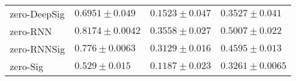 \begin{tabular}{llll}
zero-DeepSig   &                            $ 0.6951 \pm 0.049 $ &                            $ 0.1523 \pm 0.047 $ &                           $ 0.3527 \pm 0.041 $ \\
zero-RNN       &                           $ 0.8174 \pm 0.0042 $ &                            $ 0.3558 \pm 0.027 $ &                           $ 0.5007 \pm 0.022 $ \\
zero-RNNSig    &                            $ 0.776 \pm 0.0063 $ &                            $ 0.3129 \pm 0.016 $ &                           $ 0.4595 \pm 0.013 $ \\
zero-Sig       &                             $ 0.529 \pm 0.015 $ &                            $ 0.1187 \pm 0.023 $ &                          $ 0.3261 \pm 0.0065 $ \\
\bottomrule
\end{tabular}
